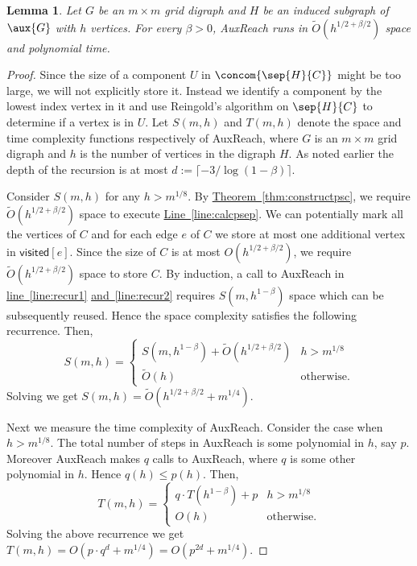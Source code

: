 \documentclass[11pt]{article}
\numberwithin{equation}{section}
\newtheorem{lemma}[theorem]{Lemma}
\theoremstyle{definition}
\theoremstyle{plain}
\newcommand{\expref}[2]{\hyperref[#2]{#1~\ref{#2}}}
\begin{document}
\begin{lemma}
Let $G$ be an $m \times m$ grid %
digraph %
 and $H$ be%
an%
induced subgraph of $\aux{G}$ with $h$ vertices. For every $\beta > 0$, \textsf{AuxReach} runs in $\widetilde{O}({h}^{1/2 + \beta/2})$ space and polynomial time.
\end{lemma}
\begin{proof}
  Since the size of a component $U$ in $\concom{\sep{H}{C}}$ might be too large, we will not explicitly store it. Instead we identify a component by the lowest index vertex %
 in it and use Reingold's algorithm on $\sep{H}{C}$ to determine if a vertex is %
 in $U$. Let $S(m,h)$ and $T(m,h)$ denote the space and time complexity functions respectively of \textsf{AuxReach}, where $G$ is an $m \times m$ grid %
digraph %
 and $h$ is the number of vertices in the %
digraph %
 $H$. As noted earlier the depth of the recursion is at most 
%
$d:= \lceil -3/\log(1-\beta)\rceil$. %

Consider $S(m,h)$ for any $h > m^{1/8}$. By \expref{Theorem}{thm:constructpsc}, we require $\widetilde{O}(h^{1/2 + \beta/2})$ space to execute \expref{Line}{line:calcpsep}. We can potentially mark all the vertices of $C$ and for each edge $e$ of $C$ we store at most one additional vertex in $\textsf{visited}[e]$. Since the size of $C$ is at most $O(h^{1/2 + \beta/2})$, we require $\widetilde{O}(h^{1/2 + \beta/2})$ space to store $C$. By induction, a call to \textsf{AuxReach} in \expref{line}{line:recur1} \expref{and}{line:recur2} requires $S(m, h^{1 - \beta})$ space which can be subsequently reused. Hence the space complexity satisfies the following recurrence. Then,
\[S(m,h) =
\begin{cases}
S(m, h^{1 - \beta}) + \widetilde{O}(h^{1/2 + \beta/2}) & h > m^{1/8}\\
\widetilde{O}(h) & \textrm{otherwise}.
\end{cases}\]
Solving we get $S(m,h) = \widetilde{O}(h^{1/2 + \beta/2} + m^{1/4})$.

Next we measure the time complexity of \textsf{AuxReach}. Consider the case when $h > m^{1/8}$. The total number of steps in \textsf{AuxReach} is some polynomial in $h$, say $p$. Moreover \textsf{AuxReach} makes $q$ calls to \textsf{AuxReach}, where $q$ is some other polynomial in $h$. Hence $q(h) \leq p(h)$. Then,
\[T(m,h) =
\begin{cases}
q\cdot T(h^{1 - \beta}) + p & h > m^{1/8} \\
O(h) & \textrm{otherwise}.
\end{cases} \]
Solving the above recurrence we get $T(m,h) = O(p\cdot q^d + m^{1/4}) = O(p^{2d} + m^{1/4})$.
\end{proof}
\end{document}
